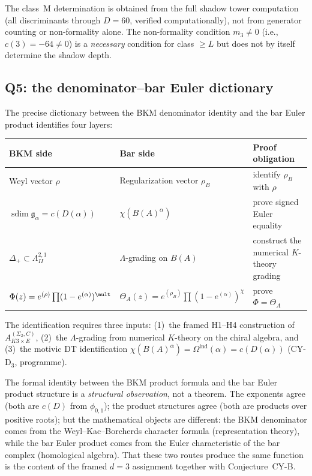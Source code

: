 \begin{remark}
\label{rem:bkm-shadow-class}
The class~M determination is obtained from the full shadow tower computation (all discriminants through $D = 60$, verified computationally), not from generator counting or non-formality alone. The non-formality condition $m_3 \neq 0$ (i.e., $c(3) = -64 \neq 0$) is a \emph{necessary} condition for class $\geq L$ but does not by itself determine the shadow depth.
\end{remark}

\subsection{Q5: the denominator--bar Euler dictionary}
\label{subsec:k3e-bkm-q5}

The precise dictionary between the BKM denominator identity and the bar Euler product identifies four layers:

\begin{center}
\renewcommand{\arraystretch}{1.3}
\begin{tabular}{@{}p{4.8cm}p{4.8cm}l@{}}
\textbf{BKM side} & \textbf{Bar side} & \textbf{Proof obligation} \\ \hline
Weyl vector $\rho$ & Regularization vector $\rho_B$ & identify $\rho_B$ with $\rho$ \\[3pt]
$\operatorname{sdim}\mathfrak g_\alpha = c(D(\alpha))$ & $\chi(B(A)^\alpha)$ & prove signed Euler equality \\[3pt]
$\Delta_+ \subset \Lambda^{2,1}_{II}$ & $\Lambda$-grading on $B(A)$ & construct the numerical $K$-theory grading \\[3pt]
$\Phi(z) = e^{(\rho)} \prod (1 - e^{(\alpha)})^{\mult}$ & $\Theta_A(z) = e^{(\rho_B)} \prod (1 - e^{(\alpha)})^{\chi}$ & prove $\Phi=\Theta_A$
\end{tabular}
\end{center}

\noindent The identification requires three inputs: (1)~the framed H1--H4 construction of $A_{K3 \times E}^{(\Sigma_2,C)}$, (2)~the $\Lambda$-grading from numerical $K$-theory on the chiral algebra, and (3)~the motivic DT identification $\chi(B(A)^\alpha) = \Omega^{\mathrm{ind}}(\alpha) = c(D(\alpha))$ (CY-D$_3$, programme).

\begin{remark}[denominator \texorpdfstring{$\neq$}{!=} bar Euler product]
\label{rem:bkm-denom-bar}
The formal identity between the BKM product formula and the bar Euler product structure is a \emph{structural observation}, not a theorem. The exponents agree (both are $c(D)$ from $\phi_{0,1}$); the product structures agree (both are products over positive roots); but the mathematical objects are different: the BKM denominator comes from the Weyl--Kac--Borcherds character formula (representation theory), while the bar Euler product comes from the Euler characteristic of the bar complex (homological algebra). That these two routes produce the same function is the content of the framed $d=3$ assignment together with Conjecture~CY-B.
\end{remark}

